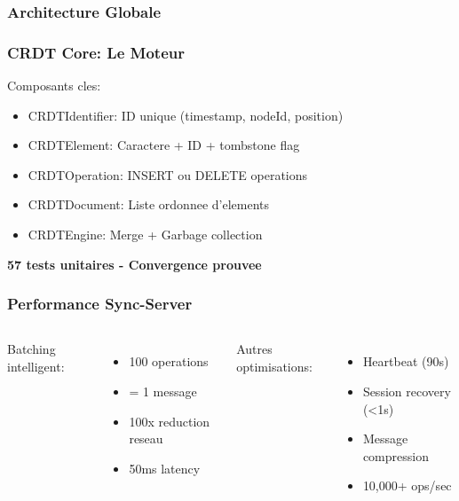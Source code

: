 \documentclass[aspectratio=16:9]{beamer}
\begin{document}
\begin{frame}
  \frametitle{Architecture Globale}
  
  \centering
  
\end{frame}

\begin{frame}
  \frametitle{CRDT Core: Le Moteur}
  
  Composants cles:
  \begin{itemize}
    \item CRDTIdentifier: ID unique (timestamp, nodeId, position)
    \item CRDTElement: Caractere + ID + tombstone flag
    \item CRDTOperation: INSERT ou DELETE operations
    \item CRDTDocument: Liste ordonnee d'elements
    \item CRDTEngine: Merge + Garbage collection
  \end{itemize}
  
  \vspace{0.5cm}
  
  \centering
  \textbf{57 tests unitaires - Convergence prouvee}
\end{frame}

\begin{frame}
  \frametitle{Performance Sync-Server}
  
  \begin{columns}[T]
    Batching intelligent:
    \begin{itemize}
      \item 100 operations
      \item = 1 message
      \item 100x reduction reseau
      \item 50ms latency
    \end{itemize}
    
    Autres optimisations:
    \begin{itemize}
      \item Heartbeat (90s)
      \item Session recovery (<1s)
      \item Message compression
      \item 10,000+ ops/sec
    \end{itemize}
  \end{columns}
\end{frame}
\end{document}
